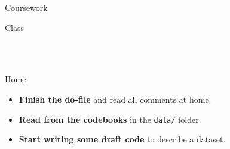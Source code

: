 \documentclass[t]{beamer}
\begin{document}
	 \begin{frame}[t]{Coursework }

    \begin{block}{Class}
      
			\\
			\\
    \end{block}

    \begin{alertblock}{Home}
      \begin{itemize}
	       \item \textbf{Finish the do-file} and read all comments at home.
	       \item \textbf{Read from the codebooks} in the \texttt{data/} folder. 
	       \item \textbf{Start writing some draft code} to describe a dataset.
      \end{itemize}
    \end{alertblock}
    		
	\end{frame}
  
	
\end{document}

